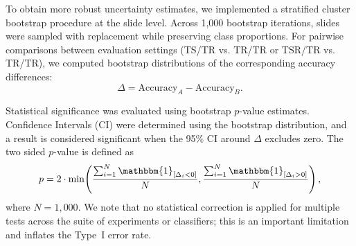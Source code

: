 \documentclass[12pt]{article}
\theoremstyle{paper}
\begin{document}


To obtain more robust uncertainty estimates, we implemented a stratified cluster bootstrap procedure at the slide level. Across 1,000 bootstrap iterations, slides were sampled with replacement while preserving class proportions. For pairwise comparisons between evaluation settings (TS/TR vs. TR/TR or TSR/TR vs. TR/TR), we computed bootstrap distributions of the corresponding accuracy differences:
\[
\Delta = \mathrm{Accuracy}_{A} - \mathrm{Accuracy}_{B}.
\]

Statistical significance was evaluated using bootstrap $p$-value estimates. Confidence Intervals (CI) were determined using the bootstrap distribution, and a result is considered significant when the 95\% CI around $\Delta$ excludes zero. The two sided $p$-value is defined as \[p = 2 \cdot \min\!\left(\frac{\sum_{i = 1}^N \mathbbm{1}_{[\Delta_i<0]}}{N},\frac{\sum_{i = 1}^N \mathbbm{1}_{[\Delta_i>0]}}{N}\right),\] where $N = 1,000$. We note that no statistical correction is applied for multiple tests across the suite of experiments or classifiers; this is an important limitation and inflates the Type~I error rate.
\end{document}
